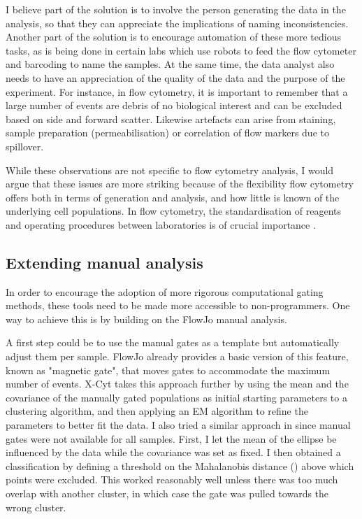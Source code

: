 I believe part of the solution is to involve the person generating the data in the analysis, so that they can appreciate the implications of naming inconsistencies.
Another part of the solution is to encourage automation of these more tedious tasks, as is being done in certain labs which use robots to feed the flow cytometer and barcoding to name the samples.
At the same time, the data analyst also needs to have an appreciation of the quality of the data and the purpose of the experiment.
For instance, in flow cytometry, it is important to remember that a large number of events are debris of no biological interest and can be excluded based on side and forward scatter.
Likewise artefacts can arise from staining, sample preparation (permeabilisation) or correlation of flow markers due to spillover.

While these observations are not specific to flow cytometry analysis, I would argue that these issues are more striking because of the flexibility flow cytometry offers both in terms of generation and analysis, and how little is known of the underlying cell populations.
In flow cytometry, the standardisation of reagents and operating procedures between laboratories is of crucial importance \citep{Maecker:2012gl}.

\subsection{Extending manual analysis}

In order to encourage the adoption of more rigorous computational gating methods, these tools need to be made more accessible to non-programmers.
One way to achieve this is by building on the FlowJo manual analysis.


A first step could be to use the manual gates as a template but automatically adjust them per sample.
FlowJo already provides a basic version of this feature, known as "magnetic gate", that moves gates to accommodate the maximum number of events.
X-Cyt \citep{Hu:2013bg} takes this approach further by using the mean and the covariance of the manually gated populations as initial starting parameters to a clustering algorithm, and then applying an \gls{EM} algorithm to refine the parameters to better fit the data.
I also tried a similar approach in  since manual gates were not available for all samples.
First, I let the mean of the ellipse be influenced by the data while the covariance was set as fixed.
I then obtained a classification by defining a threshold on the Mahalanobis distance () above which points were excluded.
This worked reasonably well unless there was too much overlap with another cluster, in which case the gate was pulled towards the wrong cluster.

